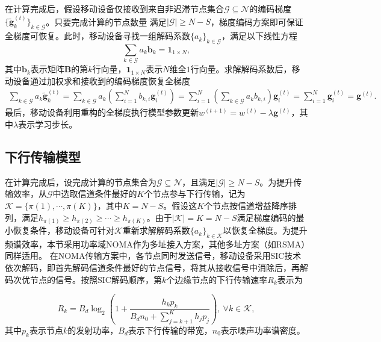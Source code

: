 	在计算完成后，假设移动设备仅接收到来自非迟滞节点集合$\mathcal{G}\subseteq\mathcal{N}$的编码梯度$\{\tilde{\mathbf{g}}_k^{(t)}\}_{k\in\mathcal{G}}$。只要完成计算的节点数量
	满足$|\mathcal{G}|\geq N-S$，梯度编码方案即可保证全梯度可恢复。此时，移动设备寻找一组解码系数$\{a_k\}_{k\in \mathcal{G}}$，满足以下线性方程
	\begin{equation}
		\sum_{k\in\mathcal{G}}a_k\mathbf{b}_k=\mathbf{1}_{1\times N},\label{decode-coeff}
	\end{equation}
	其中$\mathbf{b}_k$表示矩阵$\mathbf{B}$的第$k$行向量，$\mathbf{1}_{1\times N}$表示$N$维全$1$行向量。求解解码系数后，移动设备通过加权求和接收到的编码梯度恢复全梯度
\begin{align}
	\sum_{k\in\mathcal{G}}a_k\tilde{\mathbf{g}}_k^{(t)}=\sum_{k\in\mathcal{G}}a_k\left(\sum_{i=1}^Nb_{k,i}\mathbf{g}_i^{(t)}\right)=\sum_{i=1}^N\left(\sum_{k\in\mathcal{G}}a_kb_{k,i}\right)\mathbf{g}_i^{(t)}=\sum_{i=1}^N\mathbf{g}_i^{(t)}=\mathbf{g}^{(t)}.
\end{align}
	最后，移动设备利用重构的全梯度执行模型参数更新$w^{(t+1)}=w^{(t)}-\lambda \mathbf{g}^{(t)}$，其中$\lambda$表示学习步长。






\subsection{下行传输模型}
在计算完成后，设完成计算的节点集合为$\mathcal{G}\subseteq\mathcal{N}$，且满足$|\mathcal{G}|\geq N-S$。为提升传输效率，从$\mathcal{G}$中选取信道条件最好的$K$个节点参与下行传输，记为$\mathcal{K}=\{\pi(1),\cdots,\pi(K)\}$，其中$K=N-S$。假设这$K$个节点按信道增益降序排列，满足$h_{\pi(1)}\geq h_{\pi(2)}\geq \cdots\geq h_{\pi(K)}$。由于$|\mathcal{K}|=K=N-S$满足梯度编码的最小恢复条件，移动设备可针对$\mathcal{K}$重新求解解码系数$\{a_k\}_{k\in\mathcal{K}}$以恢复全梯度。为提升频谱效率，本节采用功率域NOMA作为多址接入方案，其他多址方案（如RSMA）同样适用。
在NOMA传输方案中，各节点同时发送信号，移动设备采用SIC技术依次解码，即首先解码信道条件最好的节点信号，将其从接收信号中消除后，再解码次优节点的信号。按照SIC解码顺序，第$k$个边缘节点的下行传输速率$R_k$表示为

\begin{equation}
	R_k=B_d\log_2\left(1+\frac{h_kp_k}{B_dn_0+\sum_{j=k+1}^{K}h_jp_j}\right)\label{sic_chapter_4},~\forall k\in\mathcal{K},
\end{equation}
其中$p_k$表示节点$k$的发射功率，$B_d$表示下行传输的带宽，$n_0$表示噪声功率谱密度。

